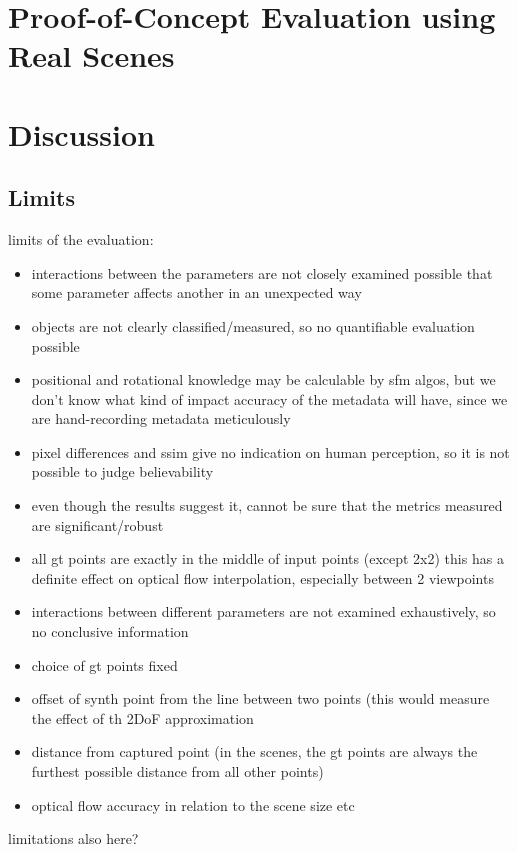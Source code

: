 \section{Proof-of-Concept Evaluation using Real Scenes}

\section{Discussion}

\subsection{Limits}

limits of the evaluation:
\begin{itemize}
  \item interactions between the parameters are not closely examined \ar possible that some parameter affects another in an unexpected way
  \item objects are not clearly classified/measured, so no quantifiable evaluation possible
  \item positional and rotational knowledge may be calculable by sfm algos, but we don't know what kind of impact accuracy of the metadata will have, since we are hand-recording metadata meticulously
  \item pixel differences and ssim give no indication on human perception, so it is not possible to judge believability
  \item even though the results suggest it, cannot be sure that the metrics measured are significant/robust
  \item all gt points are exactly in the middle of input points (except 2x2) this has a definite effect on optical flow interpolation, especially between 2 viewpoints
  \item interactions between different parameters are not examined exhaustively, so no conclusive information
\end{itemize}

\begin{itemize}
  \item choice of gt points \ar fixed
  \item \ar offset of synth point from the line between two points (this would measure the effect of th 2DoF approximation
  \item distance from captured point (in the scenes, the gt points are always the furthest possible distance from all other points)
  \item optical flow accuracy in relation to the scene size etc
\end{itemize}
limitations also here?

